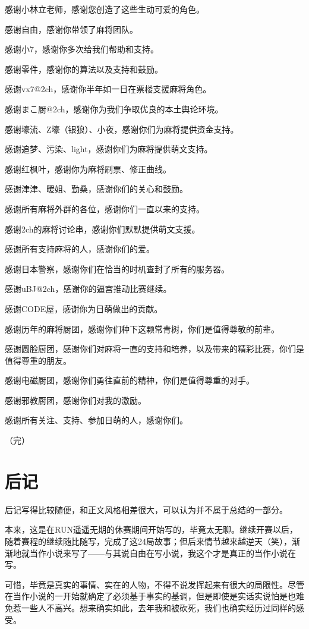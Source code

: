 感谢小林立老师，感谢您创造了这些生动可爱的角色。

感谢自由，感谢你带领了麻将团队。

感谢小7，感谢你多次给我们帮助和支持。

感谢零件，感谢你的算法以及支持和鼓励。

感谢vx7@2ch，感谢你半年如一日在票楼支援麻将角色。

感谢まこ厨@2ch，感谢你为我们争取优良的本土舆论环境。

感谢壕流、Z壕（银狼）、小夜，感谢你们为麻将提供资金支持。

感谢追梦、污染、light，感谢你们为麻将提供萌文支持。

感谢红枫叶，感谢你为麻将刷票、修正曲线。

感谢津津、暖姐、勤桑，感谢你们的关心和鼓励。

感谢所有麻将外群的各位，感谢你们一直以来的支持。

感谢2ch的麻将讨论串，感谢你们默默提供萌文支援。

感谢所有支持麻将的人，感谢你们的爱。

感谢日本警察，感谢你们在恰当的时机查封了所有的服务器。

感谢uBJ@2ch，感谢你的逼宫推动比赛继续。

感谢CODE屋，感谢你为日萌做出的贡献。

感谢历年的麻将厨团，感谢你们种下这颗常青树，你们是值得尊敬的前辈。

感谢圆脸厨团，感谢你们对麻将一直的支持和培养，以及带来的精彩比赛，你们是值得尊重的朋友。

感谢电磁厨团，感谢你们勇往直前的精神，你们是值得尊重的对手。

感谢邪教厨团，感谢你们对我的激励。

感谢所有关注、支持、参加日萌的人，感谢你们。

（完）

\section*{后记}

后记写得比较随便，和正文风格相差很大，可以认为并不属于总结的一部分。

本来，这是在RUN遥遥无期的休赛期间开始写的，毕竟太无聊。继续开赛以后，随着赛程的继续随比随写，完成了这24局故事；但后来情节越来越逆天（笑），渐渐地就当作小说来写了——与其说自由在写小说，我这个才是真正的当作小说在写。

可惜，毕竟是真实的事情、实在的人物，不得不说发挥起来有很大的局限性。尽管在当作小说的一开始就确定了必须基于事实的基调，但是即使是实话实说怕是也难免惹一些人不高兴。想来确实如此，去年我和被砍死，我们也确实经历过同样的感受。

